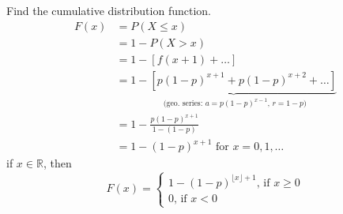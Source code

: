 Find the cumulative distribution function.
\begin{align*}
    F(x) & =P(X\le x)                                         \\
         & =1-P(X>x)                                          \\
         & =1-[f(x+1)+\dots]                                  \\
         & =\underbrace{1-[p(1-p)^{x+1}+p(1-p)^{x+2}+\dots]}_
    \text{ (geo. series: $a=p(1-p)^{x-1}$, $r=1-p$)}          \\
         & =1-\frac{p(1-p)^{x+1}}{1-(1-p)}                    \\
         & =1-(1-p)^{x+1} \text{ for } x=0,1,\ldots
\end{align*}
if $ x\in\mathbb{R} $, then
\[ F(x)=
    \begin{cases}
        1-(1-p)^{\lfloor x \rfloor +1} \text{, if } x\ge 0 \\
        0 \text{, if } x < 0
    \end{cases} \]


